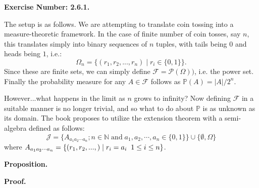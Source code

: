 \documentclass{article}
\begin{document}
\noindent \textbf{Exercise Number: 2.6.1.}

\medskip 

\noindent The setup is as follows. We are attempting to translate coin tossing into a measure-theoretic framework. In the case of finite number of coin tosses, say $n$, this translates simply into 
binary sequences of $n$ tuples, with tails being $0$ and heads being $1$, i.e.: \[\Omega_n = \{(r_1, r_2, ..., r_n) \mid r_i \in \{0,1\}\}.\] Since these are finite sets, we can simply define $\mathcal{F} = \mathcal{P}(\Omega))$, i.e. the power set. Finally the probability measure for any $A \in \mathcal{F}$ follows as $\mathbb{P}(A) = |A| / 2^n$. 

However...what happens in the limit as $n$ grows to infinity? Now defining $\mathcal{F}$ in a suitable manner is no longer trivial, and so what to do about $\mathbb{P}$ is as unknown as its domain. 
The book proposes to utilize the extension theorem with a semi-algebra defined as follows: \[\mathcal{J} = \{A_{a_1 a_2 \cdots a_n} ; n \in \mathbb{N} \; \text{and} \; a_1, a_2, \cdots, a_n \in \{0,1\}\} \cup \{\emptyset, \Omega\}\] where $A_{a_1 a_2 \cdots a_n} = \{(r_1, r_2, ..., ) \mid r_i = a_i \; \text \; 1 \leq i \leq n\}$.

\medskip

\noindent \textbf{Proposition.}  

\bigskip

\noindent \textbf{Proof.}
\end{document}
